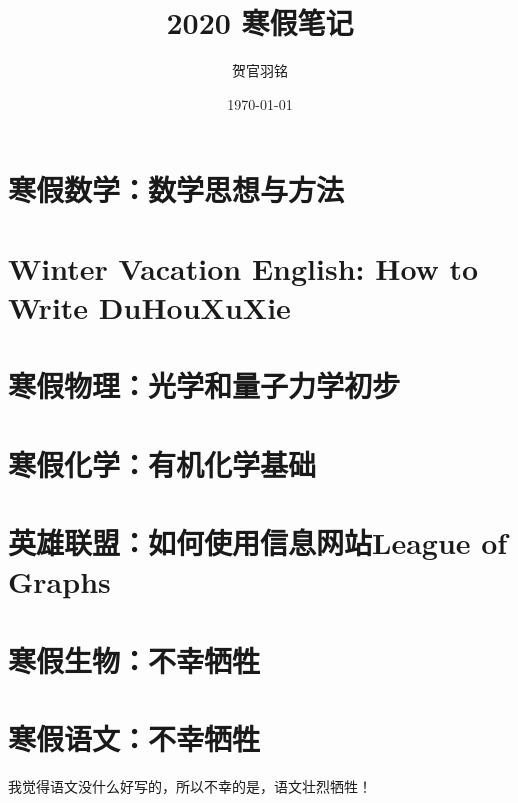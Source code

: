 \documentclass[UTF8]{ctexart}
\author{贺官羽铭}
\date{\today}
\title{2020 寒假笔记}
\begin{document}
\pagestyle{plain}


\newpage
\maketitle

\newpage
{}


\newpage
\tableofcontents

\newpage


\newpage
\pagestyle{fancy}

\part{寒假数学：数学思想与方法}


\newpage
\part{Winter Vacation English: How to Write DuHouXuXie}


\newpage
\part{寒假物理：光学和量子力学初步}


\newpage
\part{寒假化学：有机化学基础}


\newpage
\part{英雄联盟：如何使用信息网站League of Graphs}


\newpage
\part{寒假生物：不幸牺牲}


\newpage
\part{寒假语文：不幸牺牲}
我觉得语文没什么好写的，所以不幸的是，语文壮烈牺牲！

\newpage



\newpage
\listoffigures

\medskip
\listoftables
\end{document}

